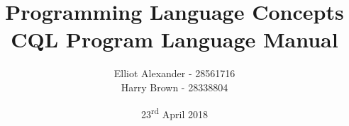 \begin{titlepage}
\title{Programming Language Concepts \\ CQL Program Language Manual}
\author{Elliot Alexander - 28561716 \\ Harry Brown - 28338804}
\date{23\textsuperscript{rd} April 2018}
\maketitle
\end{titlepage}
